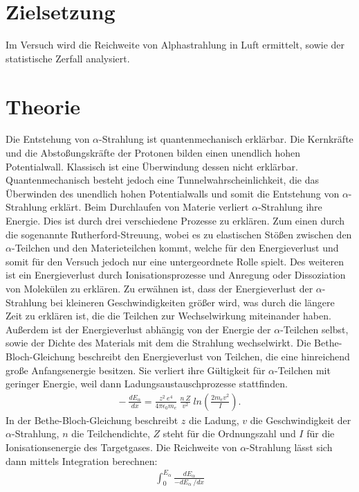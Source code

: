 
\section{Zielsetzung}
Im Versuch wird die Reichweite von Alphastrahlung in Luft ermittelt, sowie der statistische Zerfall analysiert.

\section{Theorie}
Die Entstehung von $\alpha$-Strahlung ist quantenmechanisch erklärbar. Die Kernkräfte und die Abstoßungskräfte der Protonen bilden einen unendlich
hohen Potentialwall. Klassisch ist eine Überwindung dessen nicht erklärbar. Quantenmechanisch besteht jedoch eine Tunnelwahrscheinlichkeit, die
das Überwinden des unendlich hohen Potentialwalls und somit die Entstehung von $\alpha$-Strahlung erklärt.
Beim Durchlaufen von Materie verliert $\alpha$-Strahlung ihre Energie. Dies ist durch drei verschiedene Prozesse zu erklären.
Zum einen durch die sogenannte Rutherford-Streuung, wobei es zu elastischen Stößen zwischen den $\alpha$-Teilchen und den Materieteilchen
kommt, welche für den Energieverlust und somit für den Versuch jedoch nur eine untergeordnete Rolle spielt.
Des weiteren ist ein Energieverlust durch Ionisationsprozesse und Anregung oder Dissoziation von Molekülen zu erklären.
Zu erwähnen ist, dass der Energieverlust der $\alpha$-Strahlung bei kleineren Geschwindigkeiten größer wird, was durch die längere
Zeit zu erklären ist, die die Teilchen zur Wechselwirkung miteinander haben. Außerdem ist der Energieverlust abhängig von der Energie der
$\alpha$-Teilchen selbst, sowie der Dichte des Materials mit dem die Strahlung wechselwirkt.
Die Bethe-Bloch-Gleichung beschreibt den Energieverlust von Teilchen, die eine hinreichend große Anfangsenergie besitzen. Sie verliert ihre
Gültigkeit für $\alpha$-Teilchen mit geringer Energie, weil dann Ladungsaustauschprozesse stattfinden.
\FloatBarrier
\begin{align*}
  - ~\frac{dE_\alpha}{dx} = \frac{z^2~e^4}{4\pi\epsilon_0 m_e}~\frac{n ~ Z}{v^2}~ln\left(\frac{2 m_e v^2}{I}\right) .
\end{align*}
\FloatBarrier
In der Bethe-Bloch-Gleichung beschreibt $z$ die Ladung, $v$ die Geschwindigkeit der $\alpha$-Strahlung, $n$ die Teilchendichte, $Z$ steht für die
Ordnungszahl und $I$ für die Ionisationsenergie des Targetgases.
Die Reichweite von $\alpha$-Strahlung lässt sich dann mittels Integration berechnen:
\FloatBarrier
\begin{align*}
  \int_{0}^{E_{\alpha}} \frac{dE_\alpha}{-dE_\alpha ~ / dx}
\end{align*}
